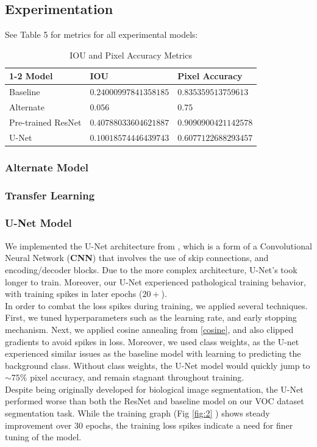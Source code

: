 \documentclass{article}
\begin{document}
\subsection{Experimentation}
See Table 5 for metrics for all experimental models:

\begin{table}[H]
  \caption{IOU and Pixel Accuracy Metrics}
  \centering
  \begin{tabular}{lll}
    \toprule
    \cmidrule(r){1-2}
    Model & IOU & Pixel Accuracy   \\
    \midrule
    Baseline                   & $0.24000997841358185$ & $0.835359513759613$  \\
    Alternate   & $0.056$ & $0.75$  \\
    Pre-trained ResNet          & $0.40788033604621887$ & $0.9090900421142578$  \\
    U-Net           & $0.10018574446439743$ & $0.6077122688293457 $  \\
    \bottomrule
  \end{tabular}
\end{table}

\subsubsection{Alternate Model}

\subsubsection{Transfer Learning}

\subsubsection{U-Net Model}
We implemented the U-Net architecture from \cite{unet}, which is a form of a Convolutional Neural Network (\textbf{CNN}) that involves the use of skip connections, and encoding/decoder blocks. Due to the more complex architecture, U-Net's took longer to train. Moreover, our U-Net experienced pathological training behavior, with training spikes in later epochs ($20+$). \\
In order to combat the loss spikes during training, we applied several techniques. First, we tuned hyperparameters such as the learning rate, and early stopping mechanism. Next, we applied cosine annealing from \ref{cosine}, and also clipped gradients to avoid spikes in loss. Moreover, we used class weights, as the U-net experienced similar issues as the baseline model with learning to predicting the background class. Without class weights, the U-Net model would quickly jump to $\sim 75\%$ pixel accuracy, and remain stagnant throughout training. \\
Despite being originally developed for biological image segmentation, the U-Net performed worse than both the ResNet and baseline model on our VOC dataset segmentation task. While the training graph (Fig \ref{fig:2} ) shows steady improvement over 30 epochs, the training loss spikes indicate a need for finer tuning of the model. 
\end{document}
